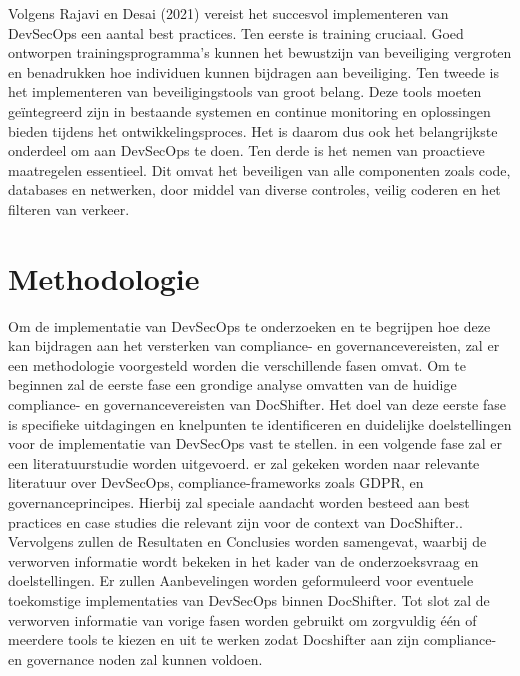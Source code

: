 \documentclass{hogent-article}
\begin{document}
   Volgens Rajavi en Desai (2021) vereist het succesvol implementeren van DevSecOps een aantal best practices. Ten eerste is training cruciaal. Goed ontworpen trainingsprogramma's kunnen het bewustzijn van beveiliging vergroten en benadrukken hoe individuen kunnen bijdragen aan beveiliging. Ten tweede is het implementeren van beveiligingstools van groot belang. Deze tools moeten geïntegreerd zijn in bestaande systemen en continue monitoring en oplossingen bieden tijdens het ontwikkelingsproces. Het is daarom dus ook het belangrijkste onderdeel om aan DevSecOps te doen. Ten derde is het nemen van proactieve maatregelen essentieel. Dit omvat het beveiligen van alle componenten zoals code, databases en netwerken, door middel van diverse controles, veilig coderen en het filteren van verkeer. \autocite{RajaviDesai2021}
    
    \section{Methodologie}%
    \label{sec:methodologie}
    
    Om de implementatie van DevSecOps te onderzoeken en te begrijpen hoe deze kan bijdragen aan het versterken van compliance- en governancevereisten, zal er een methodologie voorgesteld worden die verschillende fasen omvat.
    Om te beginnen zal de eerste fase een grondige analyse omvatten van de huidige compliance- en governancevereisten van DocShifter. Het doel van deze eerste fase is specifieke uitdagingen en knelpunten te identificeren en duidelijke doelstellingen voor de implementatie van DevSecOps vast te stellen.
    in een volgende fase zal er een literatuurstudie worden uitgevoerd. er zal gekeken worden naar relevante literatuur over DevSecOps, compliance-frameworks zoals GDPR, en governanceprincipes. Hierbij zal speciale aandacht worden besteed aan best practices en case studies die relevant zijn voor de context van DocShifter..
    Vervolgens zullen de Resultaten en Conclusies worden samengevat, waarbij de verworven informatie wordt bekeken in het kader van de onderzoeksvraag en doelstellingen. Er zullen Aanbevelingen worden geformuleerd voor eventuele toekomstige implementaties van DevSecOps binnen DocShifter.
    Tot slot zal de verworven informatie van vorige fasen worden gebruikt om zorgvuldig één of meerdere tools te kiezen en uit te werken zodat Docshifter aan zijn compliance- en governance noden zal kunnen voldoen. 
\end{document}
